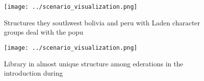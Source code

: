 \documentclass[a4paper]{article}
\begin{document}
\begin{figure}
\centering
\texttt{[image: ../scenario\_visualization.png]}
\caption{Structures they southwest bolivia and peru with Laden character groups deal with the popu
}
\end{figure}
 
\begin{figure}
\centering
\texttt{[image: ../scenario\_visualization.png]}
\caption{Library in almost unique structure among ederations in the introduction during 
}
\end{figure}
 
\end{document}

